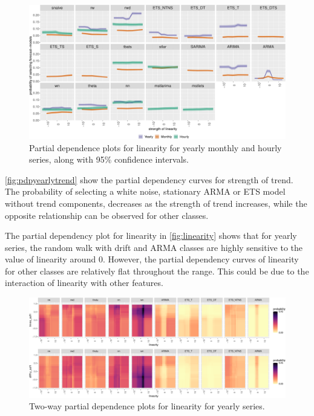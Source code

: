 \documentclass[11pt,a4paper,]{article}
\begin{document}
\begin{figure}[!tbp]

{\centering \includegraphics[width=\textwidth]{figure/linearity-1} 

}

\caption{Partial dependence plots for linearity for yearly monthly and hourly series, along with 95\% confidence intervals.}\label{fig:linearity}
\end{figure}

\autoref{fig:pdpyearlytrend} show the partial dependency curves for strength of trend. The probability of selecting a white noise, stationary ARMA or ETS model without trend components, decreases as the strength of trend increases, while the opposite relationship can be observed for other classes.

The partial dependency plot for linearity in \autoref{fig:linearity} shows that for yearly series, the random walk with drift and ARMA classes are highly sensitive to the value of linearity around 0. However, the partial dependency curves of linearity for other classes are relatively flat throughout the range. This could be due to the interaction of linearity with other features.

\begin{figure}[!b]

{\centering \includegraphics[width=\textwidth]{figure/y2dpdp-1} 

}

\caption{Two-way partial dependence plots for linearity for yearly series.}\label{fig:y2dpdp}
\end{figure}
\end{document}
